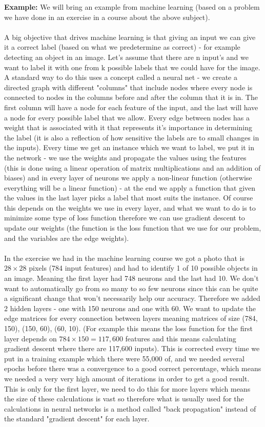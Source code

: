 \documentclass{article}
\begin{document}
\textbf{Example:} We will bring an example from machine learning (based on a problem we have done in an exercise in a course about the above subject). \\ \\
A big objective that drives machine learning is that giving an input we can give it a correct label (based on what we predetermine as correct) - for example detecting an object in an image. Let's assume that there are n input's and we want to label it with one from k possible labels that we could have for the image. A standard way to do this uses a concept called a neural net - we create a directed graph with different "columns" that include nodes where every node is connected to nodes in the columns before and after the column that it is in. The first column will have a node for each feature of the input, and the last will have a node for every possible label that we allow. Every edge between nodes has a weight that is associated with it that represents it's importance in determining the label (it is also a reflection of how sensitive the labels are to small changes in the inputs). Every time we get an instance which we want to label, we put it in the network - we use the weights and propagate the values using the features (this is done using a linear operation of matrix multiplications and an addition of biases) and in every layer of neurons we apply a non-linear function (otherwise everything will be a linear function) - at the end we apply a function that given the values in the last layer picks a label that most suits the instance. Of course this depends on the weights we use in every layer, and what we want to do is to minimize some type of loss function therefore we can use gradient descent to update our weights (the function is the loss function that we use for our problem, and the variables are the edge weights). \\ \\
In the exercise we had in the machine learning course we got a photo that is $28\times 28$ pixels (784 input features) and had to identify 1 of 10 possible objects in an image. Meaning the first layer had 748 neurons and the last had 10. We don't want to automatically go from so many to so few neurons since this can be quite a significant change that won't necessarily help our accuracy. Therefore we added 2 hidden layers - one with 150 neurons and one with 60. We want to update the edge matrices for every connection between layers meaning matrices 
of size (784, 150), (150, 60), (60, 10). (For example this means the loss function for the first layer depends on $784\times 150 = 117,600$ features and this means calculating gradient descent where there are 117,600 inputs). This is corrected every time we put in a training example which there were 55,000 of, and we needed several epochs before there was a convergence to a good correct percentage, which means we needed a very very high amount of iterations in order to get a good result. This is only for the first layer, we need to do this for more layers which means the size of these calculations is vast so therefore what is usually used for the calculations in neural networks is a method called "back propagation" instead of the standard "gradient descent" for each layer. \\ \\
\end{document}
